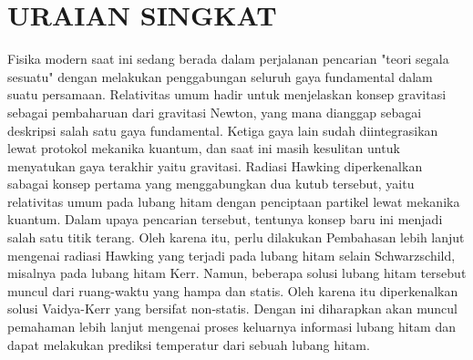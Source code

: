 \section*{\centering URAIAN SINGKAT}
Fisika modern saat ini sedang berada dalam perjalanan pencarian "teori segala sesuatu" dengan melakukan penggabungan seluruh gaya fundamental dalam suatu persamaan. Relativitas umum hadir untuk menjelaskan konsep gravitasi sebagai pembaharuan dari gravitasi Newton, yang mana dianggap sebagai deskripsi salah satu gaya fundamental. Ketiga gaya lain sudah diintegrasikan lewat protokol mekanika kuantum, dan saat ini masih kesulitan untuk menyatukan gaya terakhir yaitu gravitasi. Radiasi Hawking diperkenalkan sabagai konsep pertama yang menggabungkan dua kutub tersebut, yaitu relativitas umum pada lubang hitam dengan penciptaan partikel lewat mekanika kuantum. Dalam upaya pencarian tersebut, tentunya konsep baru ini menjadi salah satu titik terang. Oleh karena itu, perlu dilakukan Pembahasan lebih lanjut mengenai radiasi Hawking yang terjadi pada lubang hitam selain Schwarzschild, misalnya pada lubang hitam Kerr. Namun, beberapa solusi lubang hitam tersebut muncul dari ruang-waktu yang hampa dan statis. Oleh karena itu diperkenalkan solusi Vaidya-Kerr yang bersifat non-statis. Dengan ini diharapkan akan muncul pemahaman lebih lanjut mengenai proses keluarnya informasi lubang hitam dan dapat melakukan prediksi temperatur dari sebuah lubang hitam.